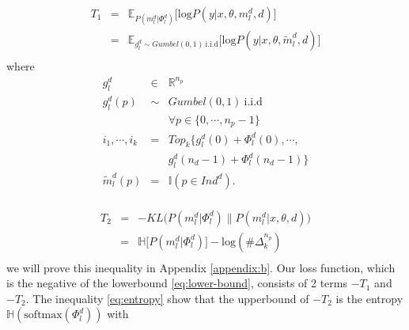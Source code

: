 \documentclass[11pt]{article}
\begin{document}
\begin{equation}
\begin{array}{rcl}
T_1 &=& \mathbb{E}_{P(m_l^d | \Phi_l^d)} \big[ \text{log} P(y | x,\theta,m_l^d, d)  \big] \\
&=& \mathbb{E}_{g_l^d \sim Gumbel(0,1) \ \text{i.i.d}} \big[ \text{log} P(y | x,\theta,\tilde{m}_l^d,d) \big] \\
\end{array}
\end{equation}
where
\begin{equation}
\begin{array}{rcl}
g_l^d & \in & \mathbb{R}^{n_p} \\
g_l^d(p) & \sim & Gumbel(0,1) \ \text{i.i.d} \\
&& \forall p \in \{ 0,\cdots,n_p-1 \} \\
i_1, \cdots, i_k &=& Top_{k} \{ g_l^d(0) + \Phi_l^d(0), \cdots,\\ &&g_l^d(n_d-1) + \Phi_l^d(n_d-1) \} \\
\tilde{m}_l^d(p) &=& \mathbb{I}(p \in Ind^d). \\
\end{array}
\end{equation}

\begin{equation}
\begin{array}{rcl}
T_2 &=& - KL \big( P(m_l^d | \Phi_l^d) \parallel P(m_l^d | x,\theta,d) \big) \\
	&=& \mathbb{H} \big[ P(m_l^d | \Phi_l^d) \big] - \text{log}(\#\Delta^{n_p}_k) \\ \label{eq:entropy}
\end{array}
\end{equation}
we will prove this inequality in Appendix \ref{appendix:b}.
Our loss function, which is the negative of the lowerbound \eqref{eq:lower-bound}, consists of 2 terms $-T_1$ and $-T_2$. The inequality \eqref{eq:entropy} show that the upperbound of $-T_2$ is the entropy $\mathbb{H}(\text{softmax}(\Phi_l^d))$ with 

\end{document}
